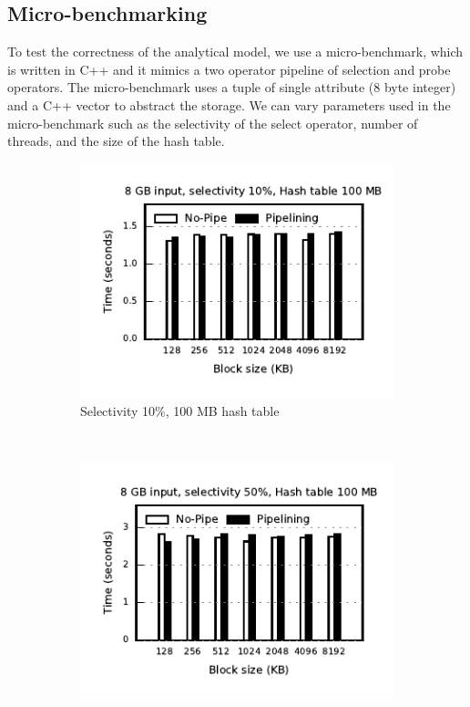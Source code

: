 \subsection{Micro-benchmarking}
To test the correctness of the analytical model, we use a micro-benchmark, which is written in C++ and it mimics a two operator pipeline of selection and probe operators. 
The micro-benchmark uses a tuple of single attribute (8 byte integer) and a C++ vector to abstract the storage.
We can vary parameters used in the micro-benchmark such as the selectivity of the select operator, number of threads, and the size of the hash table.

\begin{figure}[t]
	\centering
	\begin{subfigure}[ht]{0.32\textwidth}
		\includegraphics[width=\textwidth]{pipeline/figures/microbenchmark-8gbinput-100mbht-selectivity10pc}	
		\caption{Selectivity 10\%, 100 MB hash table}
	\end{subfigure}
	~
	\begin{subfigure}[ht]{0.32\textwidth}
		\includegraphics[width=\textwidth]{pipeline/figures/microbenchmark-8gbinput-100mbht-selectivity50pc}	

\end{subfigure}
\end{figure}
